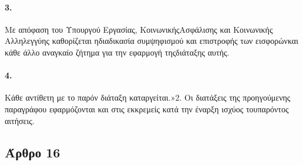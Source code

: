 \documentclass[a4paper,oneside, 10pt]{book}
\begin{document}
\paragraph { 3. } Με απόφαση του Υπουργού Εργασίας, ΚοινωνικήςΑσφάλισης και Κοινωνικής Αλληλεγγύης καθορίζεται ηδιαδικασία συμψηφισμού και επιστροφής των εισφορώνκαι κάθε άλλο αναγκαίο ζήτημα για την εφαρμογή τηςδιάταξης αυτής.
\paragraph { 4. } Κάθε αντίθετη με το παρόν διάταξη καταργείται.»2. Οι διατάξεις της προηγούμενης παραγράφου εφαρμόζονται και στις εκκρεμείς κατά την έναρξη ισχύος τουπαρόντος αιτήσεις.
\subsection*{ Άρθρο 16 }
\end{document}
